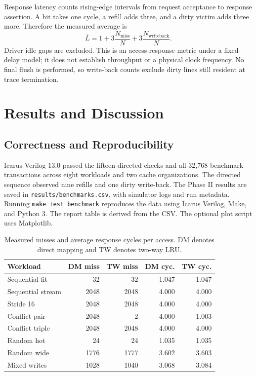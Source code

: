 \documentclass[conference]{IEEEtran}
\begin{document}
Response latency counts rising-edge intervals from request acceptance to
response assertion. A hit takes one cycle, a refill adds three, and a dirty
victim adds three more. Therefore the measured average is
\begin{equation}
\bar{L}=1+3\frac{N_{\mathrm{miss}}}{N}
          +3\frac{N_{\mathrm{writeback}}}{N}.
\label{eq:latency}
\end{equation}
Driver idle gaps are excluded. This is an access-response metric under a
fixed-delay model; it does not establish throughput or a physical clock
frequency. No final flush is performed, so write-back counts exclude dirty
lines still resident at trace termination.

\section{Results and Discussion}
\subsection{Correctness and Reproducibility}
Icarus Verilog 13.0 passed the fifteen directed checks and all 32,768 benchmark
transactions across eight workloads and two cache organizations.
The directed sequence observed nine refills and one dirty write-back.
The Phase II results are saved in \texttt{results/benchmarks.csv}, with
simulator logs and run metadata. Running \texttt{make test benchmark}
reproduces the data using Icarus Verilog, Make, and Python 3.
The report table is derived from the CSV. The optional plot script uses
Matplotlib.

\begin{table}[t]
\caption{Measured misses and average response cycles per access.
DM denotes direct mapping and TW denotes two-way LRU.}
\label{tab:results}
\centering\small
\setlength{\tabcolsep}{4.5pt}
\begin{tabular}{lrrrr}
\toprule
Workload & DM miss & TW miss & DM cyc. & TW cyc. \\
\midrule
Sequential fit & 32 & 32 & 1.047 & 1.047 \\
Sequential stream & 2048 & 2048 & 4.000 & 4.000 \\
Stride 16 & 2048 & 2048 & 4.000 & 4.000 \\
Conflict pair & 2048 & 2 & 4.000 & 1.003 \\
Conflict triple & 2048 & 2048 & 4.000 & 4.000 \\
Random hot & 24 & 24 & 1.035 & 1.035 \\
Random wide & 1776 & 1777 & 3.602 & 3.603 \\
Mixed writes & 1028 & 1040 & 3.068 & 3.084 \\
\bottomrule
\end{tabular}
\end{table}
\end{document}
